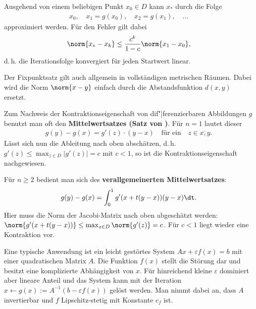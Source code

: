 Ausgehend von einem beliebigen Punkt $x_0 \in D$ kann $x_\ast$ durch die Folge
\begin{align*}
    x_0, \quad
    x_1 = g(x_0), \quad
    x_2 = g(x_1), \quad
    \dotsc
\end{align*}
approximiert werden.
Für den Fehler gilt dabei
\begin{align*}
    \norm{x_\ast - x_k} \le \frac{c^k}{1 - c} \norm{x_1 - x_0},
\end{align*}
d.\,h. die Iterationsfolge konvergiert für jeden Startwert linear.

Der Fixpunktsatz gilt auch allgemein in vollständigen metrischen Räumen.
Dabei wird die Norm $\norm{x - y}$ einfach durch die Abstandsfunktion
$d(x, y)$ ersetzt.

\linie

Zum Nachweis der Kontraktionseigenschaft von dif"|ferenzierbaren
Abbildungen $g$ benutzt man oft den
\textbf{Mittelwertsatzes (Satz von )}.
Für $n = 1$ lautet dieser
\begin{align*}
    g(y) - g(x) = g'(z) \cdot (y - x) \quad\text{für ein}\quad
    z \in \overline{x,y}.
\end{align*}
Lässt sich nun die Ableitung nach oben abschätzen, d.\,h.
$g'(z) \le \max_{z \in D} |g'(z)| = c$ mit $c < 1$, so ist die
Kontraktionseigenschaft nachgewiesen.

Für $n \ge 2$ bedient man sich des \textbf{verallgemeinerten Mittelwertsatzes}:
\begin{align*}
    g(y) - g(x) = \int_0^1 g'(x + t(y - x))(y - x) \dt.
\end{align*}
Hier muss die Norm der Jacobi-Matrix nach oben abgeschätzt werden: \\
$\norm{g'(x + t(y - x))} \le \max_{z \in D} \norm{g'(z)} = c$.
Für $c < 1$ liegt wieder eine Kontraktion vor.

\linie
\pagebreak

Eine typische Anwendung ist ein leicht gestörtes System
$Ax + \varepsilon f(x) = b$ mit einer quadratischen Matrix $A$.
Die Funktion $f(x)$ stellt die Störung dar und besitzt eine komplizierte
Abhängigkeit von $x$.
Für hinreichend kleine $\varepsilon$ dominiert aber lineare Anteil und
das System kann mit der Iteration
$x \leftarrow g(x) := A^{-1} (b - \varepsilon f(x))$ gelöst werden.
Man nimmt dabei an, dass $A$ invertierbar und $f$ Lipschitz-stetig mit
Konstante $c_f$ ist.

